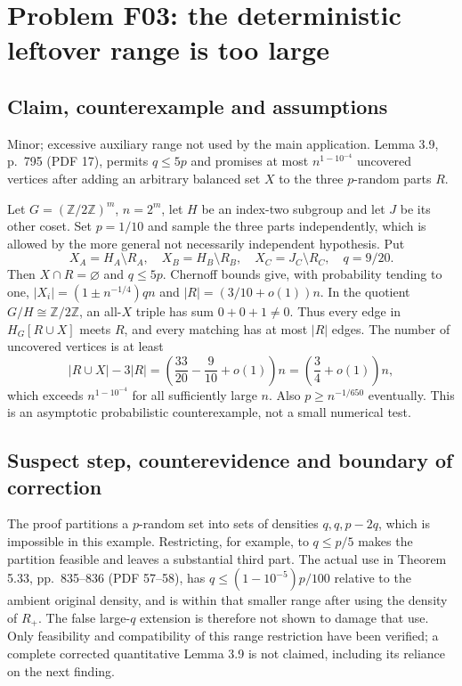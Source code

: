 \documentclass[10pt]{article}
\begin{document}
\section*{Problem F03: the deterministic leftover range is too large}
\subsection*{Claim, counterexample and assumptions}
Minor; excessive auxiliary range not used by the main application. Lemma 3.9, p. 795 (PDF 17), permits \(q\leq5p\) and promises at most \(n^{1-10^{-4}}\) uncovered vertices after adding an arbitrary balanced set \(X\) to the three \(p\)-random parts \(R\).\par
Let \(G=(\mathbb Z/2\mathbb Z)^m\), \(n=2^m\), let \(H\) be an index-two subgroup and let \(J\) be its other coset. Set \(p=1/10\) and sample the three parts independently, which is allowed by the more general not necessarily independent hypothesis. Put \[X_A=H_A\setminus R_A,\quad X_B=H_B\setminus R_B,\quad
X_C=J_C\setminus R_C,\quad q=9/20.\] Then \(X\cap R=\varnothing\) and \(q\leq5p\). Chernoff bounds give, with probability tending to one, \(|X_i|=(1\pm n^{-1/4})qn\) and \(|R|=(3/10+o(1))n\). In the quotient \(G/H\cong\mathbb Z/2\mathbb Z\), an all-\(X\) triple has sum \(0+0+1\neq0\). Thus every edge in \(H_G[R\cup X]\) meets \(R\), and every matching has at most \(|R|\) edges. The number of uncovered vertices is at least \[|R\cup X|-3|R|
=\left(\frac{33}{20}-\frac9{10}+o(1)\right)n
=\left(\frac34+o(1)\right)n,\] which exceeds \(n^{1-10^{-4}}\) for all sufficiently large \(n\). Also \(p\geq n^{-1/650}\) eventually. This is an asymptotic probabilistic counterexample, not a small numerical test.\par
\subsection*{Suspect step, counterevidence and boundary of correction}
The proof partitions a \(p\)-random set into sets of densities \(q,q,p-2q\), which is impossible in this example. Restricting, for example, to \(q\leq p/5\) makes the partition feasible and leaves a substantial third part. The actual use in Theorem 5.33, pp. 835–836 (PDF 57–58), has \(q\leq(1-10^{-5})p/100\) relative to the ambient original density, and is within that smaller range after using the density of \(R_+\). The false large-\(q\) extension is therefore not shown to damage that use. Only feasibility and compatibility of this range restriction have been verified; a complete corrected quantitative Lemma 3.9 is not claimed, including its reliance on the next finding.\par
\end{document}
